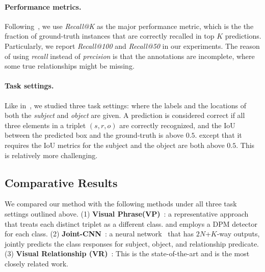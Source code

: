 \documentclass[10pt,twocolumn,letterpaper]{article}
\begin{document}
\paragraph{Performance metrics.}%
Following~\cite{lu2016visual}, we use \emph{Recall@K} as the major performance metric,
which is the the fraction of ground-truth instances that are correctly recalled in top $K$ predictions.
Particularly, we report \emph{Recall@100} and \emph{Recall@50} in our experiments.
%
The reason of using \emph{recall} instead of \emph{precision} is that
the annotations are incomplete, where some true relationships might be missing.

\paragraph{Task settings.}%
Like in~\cite{lu2016visual}, we studied three task settings:
where the labels and the locations of both the \emph{subject} and \emph{object} are given.
A prediction is considered correct if all three elements in a triplet $(s, r, o)$ are
correctly recognized, and the IoU between the predicted box and the ground-truth is
above $0.5$.
except that it requires the IoU metrics for the subject and the object
are both above $0.5$. This is relatively more challenging.

\subsection{Comparative Results}%

We compared our method with the following methods under all three task settings outlined above.
%
(1) \textbf{Visual Phrase(VP)}~\cite{sadeghi2011recognition}:
a representative approach that treats each distinct triplet as a different class.
and employs a DPM detector~\cite{lsvm-pami} for each class.
%
(2) \textbf{Joint-CNN}~\cite{fang2015captions}:
a neural network~\cite{Simonyan14c} that has $2N$+$K$-way outputs, jointly predicts the class responses
for subject, object, and relationship predicate.
%
(3) \textbf{Visual Relationship (VR)}~\cite{lu2016visual}:
This is the state-of-the-art and is the most closely related work.
\end{document}
